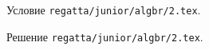 Условие \texttt{regatta/junior/algbr/2.tex}.

\solution Решение \texttt{regatta/junior/algbr/2.tex}.
